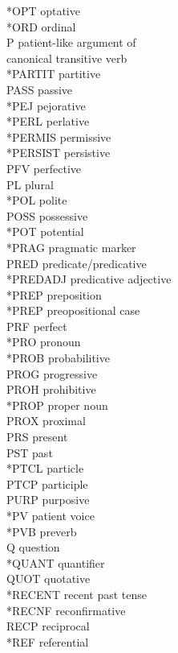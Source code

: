 \documentclass[a4paper, 11pt]{book}
\begin{document}
\begin{multicols}{2}
\begin{tabbing}
	*OPT \> optative \\
	*ORD \> ordinal \\
	P \> patient-like argument of \\
		\> canonical transitive verb \\
	*PARTIT \> partitive \\
	PASS \> passive \\
	*PEJ \> pejorative \\
	*PERL \> perlative \\
	*PERMIS \> permissive \\
	*PERSIST \> persistive \\
	PFV \> perfective \\
	PL \> plural \\
	*POL \> polite \\
	POSS \> possessive \\
	*POT \> potential \\
	*PRAG \> pragmatic marker \\
	PRED \> predicate/predicative \\
	*PREDADJ \> predicative adjective \\
	*PREP \> preposition \\
	*PREP \> preopositional case \\
	PRF \> perfect \\
	*PRO \> pronoun \\
	*PROB \> probabilitive \\
	PROG \> progressive \\
	PROH \> prohibitive \\
	*PROP \> proper noun \\
	PROX \> proximal \\
	PRS \> present \\
	PST \> past \\
	*PTCL \> particle \\
	PTCP \> participle \\
	PURP \> purposive \\
	*PV \> patient voice \\
	*PVB \> preverb \\
	Q \> question \\
	*QUANT \> quantifier \\
	QUOT \> quotative \\
	*RECENT \> recent past tense \\
	*RECNF \> reconfirmative \\
	RECP \> reciprocal \\
	*REF \> referential \\

\end{tabbing}
\end{multicols}
\end{document}

